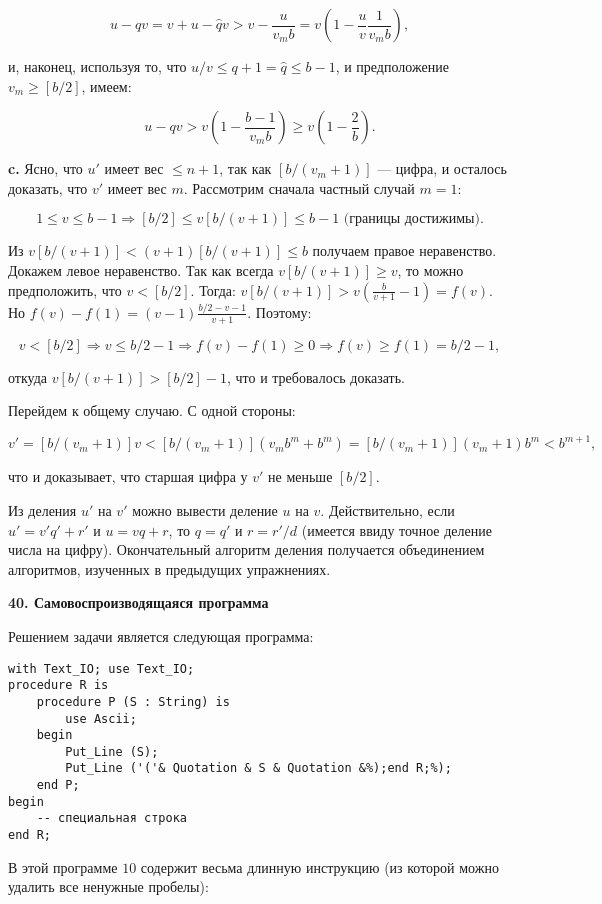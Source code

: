 \[
u-qv = v+u-\hat{q}v > v-\dfrac{u}{v_mb} = v(1-\dfrac{u}{v}\dfrac{1}{v_mb}),
\]

\noindent и, наконец, используя то, что $u/v \le q+1 = \hat{q} \le b-1$, и предположение $v_m \ge [b/2]$, имеем:

\[
u-qv > v(1-\dfrac{b-1}{v_mb}) \ge v(1-\dfrac{2}{b}).
\]

\textbf{c.} Ясно, что $u'$ имеет вес $\le n+1$, так как $[b/(v_m + 1)]$ — цифра, и осталось доказать, что $v'$ имеет вес $m$. Рассмотрим сначала частный случай $m = 1$:

\[
1 \le v \le b-1 \Longrightarrow [b/2] \le v[b/(v+1)] \le b-1 \text{ (границы достижимы)}.
\]

\noindent Из $v[b/(v+1)] < (v+1)[b/(v+1)] \le b$ получаем правое неравенство. Докажем левое неравенство. Так как всегда $v[b/(v+1)] \ge v$, то можно предположить, что $v<[b/2]$. Тогда: $v[b/(v+1)] > v(\frac{b}{v+1} - 1) = f(v)$. Но $f(v)-f(1) = (v-1)\frac{b/2-v-1}{v+1}$. Поэтому:

\[
v < [b/2] \Longrightarrow v \le b/2-1 \Longrightarrow f(v)-f(1) \ge 0 \Longrightarrow f(v) \ge f(1) = b/2-1,
\]

откуда $v[b/(v+1)] > [b/2]-1$, что и требовалось доказать.

Перейдем к общему случаю. С одной стороны:

\[
v' = [b/(v_m+1)]v < [b/(v_m+1)](v_mb^m+b^m) = [b/(v_m+1)](v_m+1)b^m<b^{m+1},
\]

\noindent что и доказывает, что старшая цифра у $v'$ не меньше $[b/2]$.

Из деления $u'$ на $v'$ можно вывести деление $u$ на $v$. Действительно, если $u'=v'q'+r'$ и $u=vq+r$, то $q=q'$ и $r=r'/d$ (имеется ввиду точное деление числа на цифру). Окончательный алгоритм деления получается объединением алгоритмов, изученных в предыдущих упражнениях.

\pagebreak

\noindent \textbf{40. Самовоспроизводящаяся программа}

Решением задачи является следующая программа:

\begin{lstlisting}[frame=none]
with Text_IO; use Text_IO;
procedure R is
	procedure P (S : String) is
		use Ascii;
	begin
		Put_Line (S);
		Put_Line ('('& Quotation & S & Quotation &%);end R;%);
	end P;
begin
	-- специальная строка
end R;
\end{lstlisting}

В этой программе $10$ содержит весьма длинную инструкцию (из которой можно удалить все ненужные пробелы):

